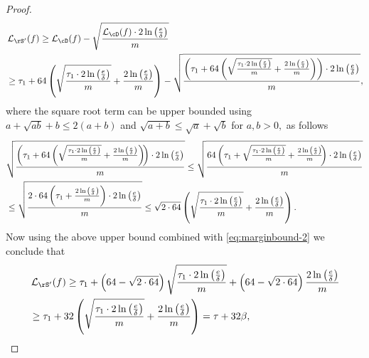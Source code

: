 \begin{proof}
   \begin{align}\label{eq:marginbound-2}
    &\ls_{\rS'}(f)\geq \ls_{\cD}(f)-\sqrt{\frac{\ls_{\cD}(f)\cdot 2\ln{\left(\frac{e}{\delta} \right)}}{m}}
    \\
    &\geq \tau_{1} 
    +\cc\left(\sqrt{\frac{\tau_{1}\cdot 2 \ln{\left(\frac{e}{\delta} \right)}}{m}} +\frac{2\ln{\left(\frac{e}{\delta} \right)}}{m}\right) 
    -\sqrt{
        \frac{
        \left(
        \tau_{1} 
        +\cc\left(\sqrt{\frac{\tau_{1}\cdot 2 \ln{\left(\frac{e}{\delta} \right)}}{m}} 
        +\frac{2\ln{\left(\frac{e}{\delta} \right)}}{m}\right)\right)\cdot 2\ln{\left(\frac{e}{\delta} \right)}}{m}},
        \nonumber
   \end{align} 
where the square root term can be upper bounded using $ a+\sqrt{ab}+b\leq2(a+b)  $ and $ \sqrt{a+b} \leq \sqrt{a}+\sqrt{b}$ for $ a,b>0,$ as follows
   \begin{align}
    &\sqrt{
        \frac{
        \left(
        \tau_{1} 
        +64\left(\sqrt{\frac{\tau_{1}\cdot 2 \ln{\left(\frac{e}{\delta} \right)}}{m}} 
        +\frac{2\ln{\left(\frac{e}{\delta} \right)}}{m}\right)\negmedspace\right)\cdot 2\ln{\left(\frac{e}{\delta} \right)}}{m}}
        \leq 
    \sqrt{
        \frac{64
        \left(
        \tau_{1} 
        +\sqrt{\frac{\tau_{1}\cdot 2 \ln{\left(\frac{e}{\delta} \right)}}{m}} 
        +\frac{2\ln{\left(\frac{e}{\delta} \right)}}{m}\negmedspace\right)\cdot 2\ln{\left(\frac{e}{\delta} \right)}}{m}}\nonumber
    \\
    &\leq\sqrt{
        \frac{2\cdot 64
        \left(
        \tau_{1} 
        +
        \frac{2\ln{\left(\frac{e}{\delta} \right)}}{m}\right)\cdot 2\ln{\left(\frac{e}{\delta} \right)}
        }{m}}\nonumber
        \leq\sqrt{2\cdot64}\left(
          \sqrt{ 
            \frac{
            \tau_{1}\cdot2 
            \ln{\left(\frac{e}{\delta} \right)}
            }{m}}
            +
            \frac{2\ln{\left(\frac{e}{\delta}\right)}
            }{m}\right)\nonumber.
   \end{align}
   Now using the above upper bound combined with \cref{eq:marginbound-2} we conclude that
   \begin{align}\label{eq:marginbound1}
    &\ls_{\rS'}(f)
        \geq
        \tau_{1} 
        +\left(\cc-\sqrt{2\cdot\cc}\right)\sqrt{\frac{\tau_{1}\cdot 2 \ln{\left(\frac{e}{\delta} \right)}}{m}} +\left(\cc-\sqrt{2\cdot\cc}\right)\frac{2\ln{\left(\frac{e}{\delta} \right)}}{m}
        \\
        &\geq \tau_{1}
        +
        32
        \left(\sqrt{\frac{\tau_{1}\cdot 2 \ln{\left(\frac{e}{\delta} \right)}}{m}} +\frac{2\ln{\left(\frac{e}{\delta} \right)}}{m}\right)=\tau+32\beta \nonumber,

\end{align}
\end{proof}
